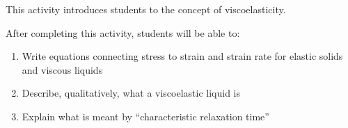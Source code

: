 %
%
%
%

\renewcommand{\figpath}{content/polymphys/mechanical-properties/viscoelasticity/figs}
\newcommand{\labelbase}{}
\renewcommand{\labelbase}{viscoelasticity}

\begin{activity}

\begin{instructornotes}

	This activity introduces students to the concept of viscoelasticity.
	
	After completing this activity, students will be able to:
			\begin{enumerate}
				\item Write equations connecting stress to strain and strain rate for elastic solids and viscous liquids
				\item Describe, qualitatively, what a viscoelastic liquid is
				\item Explain what is meant by ``characteristic relaxation time''
			\end{enumerate}
	
			

\end{instructornotes}
\end{activity}

